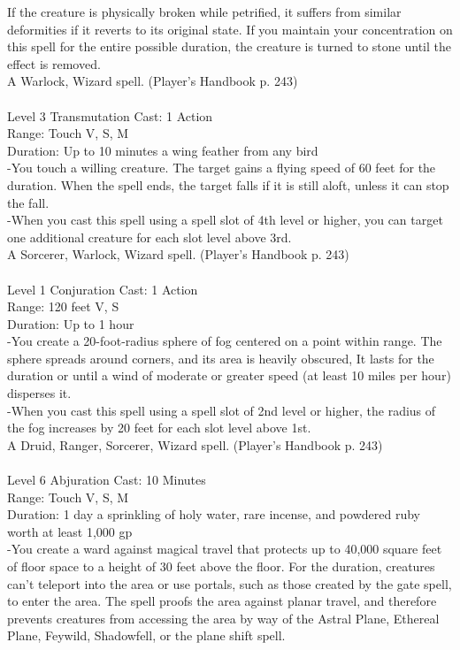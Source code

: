 \documentclass[10pt,twocolumn]{report}
\begin{document}
If the creature is physically broken while petrified, it suffers from similar deformities if it reverts to its original state. If you maintain your concentration on this spell for the entire possible duration, the creature is turned to stone until the effect is removed.\\
A Warlock, Wizard spell. (Player's Handbook p. 243) \\


 \\
Level 3 \quad Transmutation \quad Cast: 1 Action\\
Range: Touch \quad V, S, M\\
Duration: Up to 10 minutes \quad a wing feather from any bird\\
-You touch a willing creature. The target gains a flying speed of 60 feet for the duration. When the spell ends, the target falls if it is still aloft, unless it can stop the fall.\\
-When you cast this spell using a spell slot of 4th level or higher, you can target one additional creature for each slot level above 3rd.\\
A Sorcerer, Warlock, Wizard spell. (Player's Handbook p. 243) \\


 \\
Level 1 \quad Conjuration \quad Cast: 1 Action\\
Range: 120 feet \quad V, S\\
Duration: Up to 1 hour \quad \\
-You create a 20-foot-radius sphere of fog centered on a point within range. The sphere spreads around corners, and its area is heavily obscured, It lasts for the duration or until a wind of moderate or greater speed (at least 10 miles per hour) disperses it.\\
-When you cast this spell using a spell slot of 2nd level or higher, the radius of the fog increases by 20 feet for each slot level above 1st.\\
A Druid, Ranger, Sorcerer, Wizard spell. (Player's Handbook p. 243) \\


 \\
Level 6 \quad Abjuration \quad Cast: 10 Minutes\\
Range: Touch \quad V, S, M\\
Duration: 1 day \quad a sprinkling of holy water, rare incense, and powdered ruby worth at least 1,000 gp\\
-You create a ward against magical travel that protects up to 40,000 square feet of floor space to a height of 30 feet above the floor. For the duration, creatures can’t teleport into the area or use portals, such as those created by the gate spell, to enter the area. The spell proofs the area against planar travel, and therefore prevents creatures from accessing the area by way of the Astral Plane, Ethereal Plane, Feywild, Shadowfell, or the plane shift spell.
\end{document}
